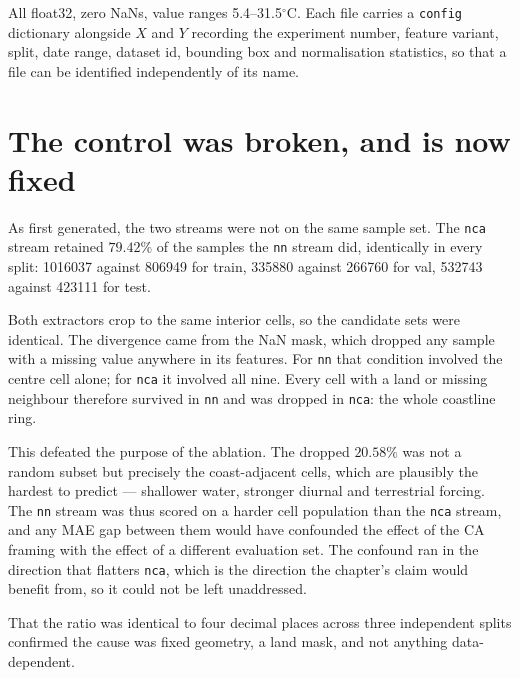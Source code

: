 \documentclass[11pt]{amsart}
\begin{document}
All float32, zero NaNs, value ranges 5.4--31.5${}^\circ$C. Each file carries a
\texttt{config} dictionary alongside $X$ and $Y$ recording the experiment
number, feature variant, split, date range, dataset id, bounding box and
normalisation statistics, so that a file can be identified independently of
its name.

\section{The control was broken, and is now fixed}

As first generated, the two streams were not on the same sample set. The
\texttt{nca} stream retained $79.42\%$ of the samples the \texttt{nn} stream
did, identically in every split: 1016037 against 806949 for train, 335880
against 266760 for val, 532743 against 423111 for test.

Both extractors crop to the same interior cells, so the candidate sets were
identical. The divergence came from the NaN mask, which dropped any sample with
a missing value anywhere in its features. For \texttt{nn} that condition
involved the centre cell alone; for \texttt{nca} it involved all nine. Every
cell with a land or missing neighbour therefore survived in \texttt{nn} and was
dropped in \texttt{nca}: the whole coastline ring.

This defeated the purpose of the ablation. The dropped $20.58\%$ was not a
random subset but precisely the coast-adjacent cells, which are plausibly the
hardest to predict --- shallower water, stronger diurnal and terrestrial
forcing. The \texttt{nn} stream was thus scored on a harder cell population than
the \texttt{nca} stream, and any MAE gap between them would have confounded the
effect of the CA framing with the effect of a different evaluation set. The
confound ran in the direction that flatters \texttt{nca}, which is the direction
the chapter's claim would benefit from, so it could not be left unaddressed.

That the ratio was identical to four decimal places across three independent
splits confirmed the cause was fixed geometry, a land mask, and not anything
data-dependent.
\end{document}

